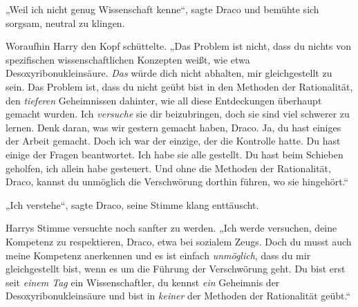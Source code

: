 „Weil ich nicht genug Wissenschaft kenne“, sagte Draco und bemühte sich sorgsam, neutral zu klingen.

Woraufhin Harry den Kopf schüttelte. „Das Problem ist nicht, dass du nichts von spezifischen wissenschaftlichen Konzepten weißt, wie etwa Desoxyribonukleinsäure. \emph{Das} würde dich nicht abhalten, mir gleichgestellt zu sein. Das Problem ist, dass du nicht geübt bist in den Methoden der Rationalität, den \emph{tieferen} Geheimnissen dahinter, wie all diese Entdeckungen überhaupt gemacht wurden. Ich \emph{versuche} sie dir beizubringen, doch sie sind viel schwerer zu lernen. Denk daran, was wir gestern gemacht haben, Draco. Ja, du hast einiges der Arbeit gemacht. Doch ich war der einzige, der die Kontrolle hatte. Du hast einige der Fragen beantwortet. Ich habe sie alle gestellt. Du hast beim Schieben geholfen, ich allein habe gesteuert. Und ohne die Methoden der Rationalität, Draco, kannst du unmöglich die Verschwörung dorthin führen, wo sie hingehört.“

„Ich verstehe“, sagte Draco, seine Stimme klang enttäuscht.

Harrys Stimme versuchte noch sanfter zu werden. „Ich werde versuchen, deine Kompetenz zu respektieren, Draco, etwa bei sozialem Zeugs. Doch du musst auch meine Kompetenz anerkennen und es ist einfach \emph{unmöglich}, dass du mir gleichgestellt bist, wenn es um die Führung der Verschwörung geht. Du bist erst seit \emph{einem Tag} ein Wissenschaftler, du kennst \emph{ein} Geheimnis der Desoxyribonukleinsäure und bist in \emph{keiner} der Methoden der Rationalität geübt.“

